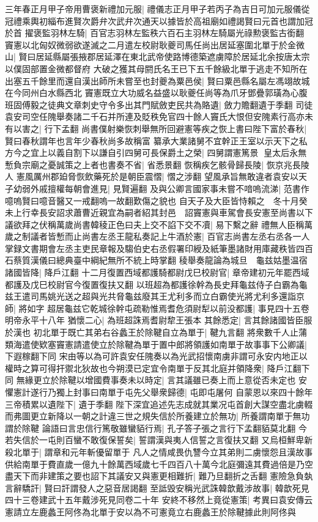 三年春正月甲子帝用曹褒新禮加元服|{
	禮儀志正月甲子若丙子為吉日可加元服儀從冠禮乘輿初緇布進賢次爵弁次武弁次通天以據皆於高祖廟如禮謁賢曰元首也謂加冠於首}
擢褒監羽林左騎|{
	百官志羽林左監秩六百石主羽林左騎屬光祿勲褒監古銜翻}
竇憲以北匈奴微弱欲遂滅之二月遣左校尉耿夔司馬任尚出居延塞圍北單于於金微山|{
	賢曰居延縣屬張掖郡居延澤在東北武帝使路博德築遮虜障於居延北余按唐太宗以僕固部置金微都督府}
大破之獲其母閼氏名王已下五千餘級北單于逃走不知所在出塞五千餘里而還自漢出師所未嘗至也封夔為粟邑侯|{
	賢曰粟邑縣名屬左馮翊故城在今同州白水縣西北}
竇憲既立大功威名益盛以耿夔任尚等為爪牙鄧疊郭璜為心腹班固傅毅之徒典文章刺史守令多出其門賦斂吏民共為賂遺|{
	斂力贍翻遺于季翻}
司徒袁安司空任隗舉奏諸二千石并所連及貶秩免官四十餘人竇氏大恨但安隗素行高亦未有以害之|{
	行下孟翻}
尚書僕射樂恢刺舉無所回避憲等疾之恢上書曰陛下富於春秋|{
	賢曰春秋謂年也言年少春秋尚多故稱富}
纂承大業諸舅不宜幹正王室以示天下之私方今之宜上以義自割下以謙自引四舅可長保爵土之榮|{
	四舅謂憲篤景}
皇太后永無慙負宗廟之憂誠策之上者也書奏不省|{
	省悉景翻}
恢稱疾乞骸骨歸長陵|{
	恢京兆長陵人}
憲風厲州郡廹脅恢飲藥死於是朝臣震慴|{
	慴之涉翻}
望風承旨無敢違者袁安以天子幼弱外戚擅權每朝會進見|{
	見賢遍翻}
及與公卿言國家事未嘗不喑嗚流涕|{
	范書作噫嗚賢曰噫音醫又一戒翻嗚一故翻歎傷之貌也}
自天子及大臣皆恃賴之　冬十月癸未上行幸長安詔求蕭曹近親宜為嗣者紹其封邑　詔竇憲與車駕會長安憲至尚書以下議欲拜之伏稱萬歲尚書韓稜正色曰夫上交不諂下交不凟|{
	易下繫之辭}
禮無人臣稱萬歲之制議者皆慙而止尚書左丞王龍私奏記上牛酒於憲|{
	百官志尚書左丞右丞各一人掌録文書期會左丞主吏民章報及騶伯史右丞假署印綬及紙筆墨諸財用庫藏秩皆四百石蔡質漢儀曰總典臺中綱紀無所不統上時掌翻}
稜舉奏龍論為城旦　龜兹姑墨温宿諸國皆降|{
	降戶江翻}
十二月復置西域都護騎都尉戊巳校尉官|{
	章帝建初元年罷西域都護及戊巳校尉官今復置復扶又翻}
以班超為都護徐幹為長史拜龜兹侍子白霸為龜兹王遣司馬姚光送之超與光共脅龜兹廢其王尤利多而立白霸使光將尤利多還詣京師|{
	將如字}
超居龜兹它乾城徐幹屯疏勒惟焉耆危須尉犁以前没都護|{
	事見四十五卷明帝永平十八年}
猶懷二心|{
	為班超誅焉耆尉犂王張本}
其餘悉定|{
	言其餘諸國皆臣服於漢也}
初北單于既亡其弟右谷蠡王於除鞬自立為單于|{
	鞬九言翻}
將衆數千人止蒲類海遣使欵塞竇憲請遣使立於除鞬為單于置中郎將領護如南單于故事事下公卿議|{
	下遐稼翻下同}
宋由等以為可許袁安任隗奏以為光武招懷南虜非謂可永安内地正以權時之算可得扞禦北狄故也今朔漠已定宜令南單于反其北庭并領降衆|{
	降戶江翻下同}
無緣更立於除鞬以增國費事奏未以時定|{
	言其議雖已奏上而上意從否未定也}
安懼憲計遂行乃獨上封事曰南單于屯先父舉衆歸德|{
	屯即屯屠何}
自蒙恩以來四十餘年三帝積累以遺陛下|{
	遺于季翻}
陛下深宜追述先志成就其業况屯首創大謀空盡北虜輟而弗圖更立新降以一朝之計違三世之規失信於所養建立於無功|{
	所養謂南單于無功謂於除鞬}
論語曰言忠信行篤敬雖蠻貊行焉|{
	孔子答子張之言行下孟翻貊莫北翻}
今若失信於一屯則百蠻不敢復保誓矣|{
	誓謂漢與夷人信誓之言復扶又翻}
又烏桓鮮卑新殺北單于|{
	謂章和元年斬優留單于}
凡人之情咸畏仇讐今立其弟則二虜懷怨且漢故事供給南單于費直歲一億九十餘萬西域歲七千四百八十萬今北庭彌遠其費過倍是乃空盡天下而非建策之要也詔下其議安又與憲更相難折|{
	難乃旦翻折之舌翻}
憲險急負埶言辭驕訐|{
	賢曰訐謂發人之惡音居謁翻}
至詆毁安稱光武誅韓歆戴涉故事|{
	韓歆死見四十三卷建武十五年戴涉死見同卷二十年}
安終不移然上竟從憲策|{
	考異曰袁安傳云憲請立左鹿蠡王阿佟為北單于安以為不可憲竟立右鹿蠡王於除鞬據此則阿佟與}


